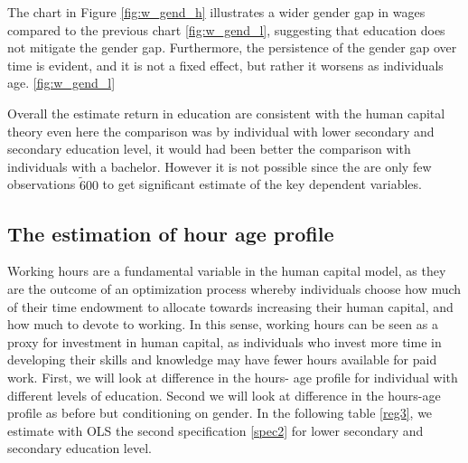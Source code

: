 \documentclass[14pt]{sistedes}
\begin{document}
The chart in Figure \ref{fig:w_gend_h} illustrates a wider gender gap in wages compared to the previous chart \ref{fig:w_gend_l}, suggesting that education does not mitigate the gender gap. Furthermore, the persistence of the gender gap over time is evident, and it is not a fixed effect, but rather it worsens as individuals age. \ref{fig:w_gend_l}

Overall the estimate return in education are consistent with the human capital theory even here the comparison was by individual with lower secondary and secondary education level, it would had been better the comparison with individuals with a bachelor. However it is not possible since the are only few observations $\tilde 600$ to get significant estimate of the key dependent variables.

\subsection{The estimation of hour age profile}
Working hours are a fundamental variable in the human capital model, as they are the outcome of an optimization process whereby individuals choose how much of their time endowment to allocate towards increasing their human capital, and how much to devote to working. In this sense, working hours can be seen as a proxy for investment in human capital, as individuals who invest more time in developing their skills and knowledge may have fewer hours available for paid work.\newline
First, we will look at difference in the hours- age profile for individual with different levels of education. Second we will look at difference in the hours-age profile as before but conditioning on gender.
In the following table \ref{reg3}, we estimate with OLS the second specification \ref{spec2} for lower secondary and secondary education level.
\end{document}
